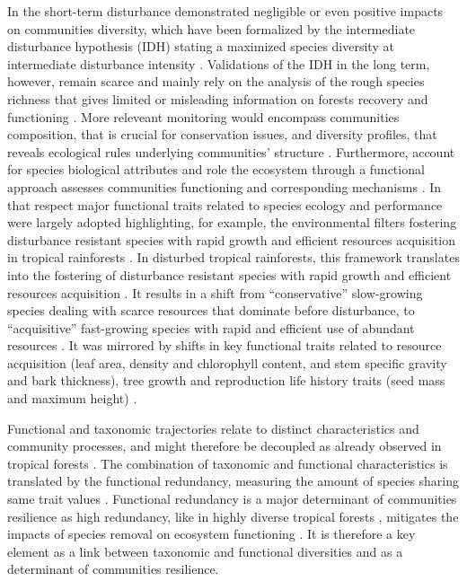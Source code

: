 \documentclass[fleqn,10pt]{ArtEcoFoG} %
\theoremstyle{definition}
\theoremstyle{definition}
\theoremstyle{definition}
\theoremstyle{remark}
\begin{document}
In the short-term disturbance demonstrated negligible or even positive
impacts on communities diversity, which have been formalized by the
intermediate disturbance hypothesis (IDH) stating a maximized species
diversity at intermediate disturbance intensity
\citep{Molino2001, Kariuki2006a, Berry2008a}. Validations of the IDH in
the long term, however, remain scarce and mainly rely on the analysis of
the rough species richness that gives limited or misleading information
on forests recovery and functioning \citep{Martin2015, Chaudhary2016}.
More releveant monitoring would encompass communities composition, that
is crucial for conservation issues, and diversity profiles, that reveals
ecological rules underlying communities' structure
\citep{Magurran1988, Lavorel2002, Bellwood2006}. Furthermore, account
for species biological attributes and role the ecosystem through a
functional approach assesses communities functioning and corresponding
mechanisms
\citep{Violle2007b, Moretti2009, Baraloto2012a, Scheiter2013}. In that
respect major functional traits related to species ecology and
performance were largely adopted \citep{Diaz2005, Villeger2008a}
highlighting, for example, the environmental filters fostering
disturbance resistant species with rapid growth and efficient resources
acquisition in tropical rainforests \citep{Molino2001, Haddad2008}. In
disturbed tropical rainforests, this framework translates into the
fostering of disturbance resistant species with rapid growth and
efficient resources acquisition \citep{Molino2001, Haddad2008}. It
results in a shift from ``conservative'' slow-growing species dealing
with scarce resources that dominate before disturbance, to
``acquisitive'' fast-growing species with rapid and efficient use of
abundant resources \citep{TerSteege2001, Reich2014, Herault2011}. It was
mirrored by shifts in key functional traits related to resource
acquisition (leaf area, density and chlorophyll content, and stem
specific gravity and bark thickness), tree growth and reproduction life
history traits (seed mass and maximum height)
\citep{Wright2004, Westoby2006a, Chave2009b}.

Functional and taxonomic trajectories relate to distinct characteristics
and community processes, and might therefore be decoupled as already
observed in tropical forests \citep{Lohbeck2015, Guariguata2001}. The
combination of taxonomic and functional characteristics is translated by
the functional redundancy, measuring the amount of species sharing same
trait values \citep{Carmona2016}. Functional redundancy is a major
determinant of communities resilience as high redundancy, like in highly
diverse tropical forests \citep{Bellwood2006}, mitigates the impacts of
species removal on ecosystem functioning
\citep{Trenbath1999, Elmqvist2003, Diaz2005}. It is therefore a key
element as a link between taxonomic and functional diversities and as a
determinant of communities resilience.
\end{document}
